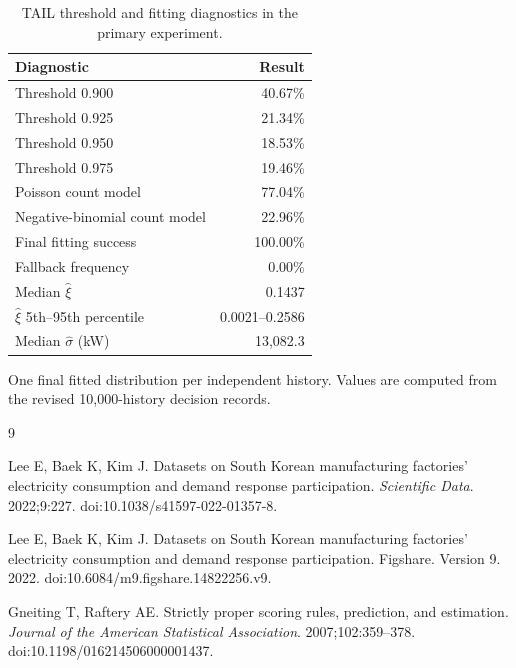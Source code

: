 \documentclass[]{interact}
\begin{document}
\begin{table}[ht]
\centering\small
\caption{TAIL threshold and fitting diagnostics in the primary experiment.}
\label{tab:tail-fit-diagnostics}
\begin{tabular}{lr}
\toprule
Diagnostic & Result\\
\midrule
Threshold 0.900 & 40.67\% \\
Threshold 0.925 & 21.34\% \\
Threshold 0.950 & 18.53\% \\
Threshold 0.975 & 19.46\% \\
Poisson count model & 77.04\% \\
Negative-binomial count model & 22.96\% \\
Final fitting success & 100.00\% \\
Fallback frequency & 0.00\% \\
Median $\widehat{\xi}$ & 0.1437 \\
$\widehat{\xi}$ 5th--95th percentile & 0.0021--0.2586 \\
Median $\widehat{\sigma}$ (kW) & 13,082.3 \\
\bottomrule
\end{tabular}
\par\smallskip\footnotesize One final fitted distribution per independent history. Values are computed from the revised 10,000-history decision records.
\end{table}

\begin{thebibliography}{9}

Lee E, Baek K, Kim J.
Datasets on South Korean manufacturing factories' electricity
consumption and demand response participation.
\textit{Scientific Data}. 2022;9:227.
doi:10.1038/s41597-022-01357-8.

Lee E, Baek K, Kim J.
Datasets on South Korean manufacturing factories' electricity
consumption and demand response participation.
Figshare. Version 9. 2022.
doi:10.6084/m9.figshare.14822256.v9.

Gneiting T, Raftery AE.
Strictly proper scoring rules, prediction, and estimation.
\textit{Journal of the American Statistical Association}.
2007;102:359--378.
doi:10.1198/016214506000001437.

\end{thebibliography}
\end{document}
